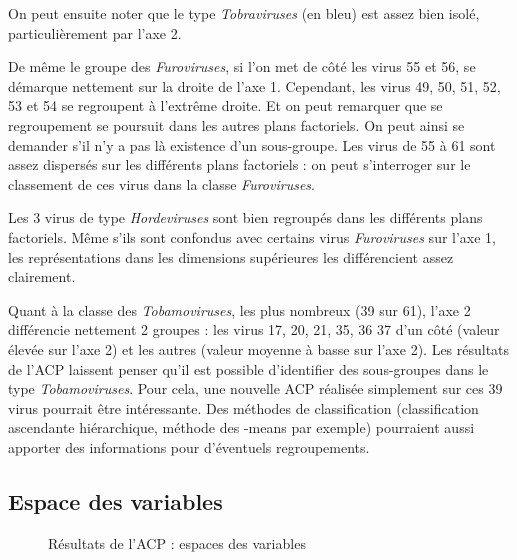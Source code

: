\documentclass[a4paper]{report}
\begin{document}
On peut ensuite noter que le type \emph{Tobraviruses} (en bleu) est assez bien isolé, particulièrement par l'axe 2. 

De même le groupe des \emph{Furoviruses}, si l'on met de côté les virus 55 et 56, se démarque nettement sur la droite de l'axe 1. Cependant, les virus 49, 50, 51, 52, 53 et 54 se regroupent à l'extrême droite. Et on peut remarquer que se regroupement se poursuit dans les autres plans factoriels. On peut ainsi se demander s'il n'y a pas là existence d'un sous-groupe. Les virus de 55 à 61 sont assez dispersés sur les différents plans factoriels : on peut s'interroger sur le classement de ces virus dans la classe \emph{Furoviruses}.
 
Les 3 virus de type \emph{Hordeviruses} sont bien regroupés dans les différents plans factoriels. Même s'ils sont confondus avec certains virus \emph{Furoviruses} sur l'axe 1, les représentations dans les dimensions supérieures les différencient assez clairement. 

Quant à la classe des \emph{Tobamoviruses}, les plus nombreux (39 sur 61), l'axe 2 différencie nettement 2 groupes : les virus 17, 20, 21, 35, 36 37 d'un côté (valeur élevée sur l'axe 2) et les autres (valeur moyenne à basse sur l'axe 2). Les résultats de l'ACP laissent penser qu'il est possible d'identifier des sous-groupes dans le type \emph{Tobamoviruses}. Pour cela, une nouvelle ACP réalisée simplement sur ces 39 virus pourrait être intéressante.  Des méthodes de classification (classification ascendante hiérarchique, méthode des -means par exemple) pourraient aussi apporter des informations pour d'éventuels regroupements.  

\subsection{Espace des variables}

      \begin{figure}[!ht]

	\centering
	\caption{Résultats de l'ACP : espaces des variables}
	 \label{ACP2}
\end{figure}
\end{document}
